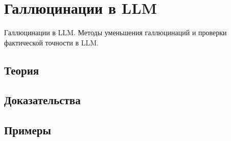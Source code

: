 
\section{Галлюцинации в LLM}
\label{sec:2.5.11-llm-hallucinations}

\begin{ticket}
Галлюцинации в LLM. Методы уменьшения галлюцинаций и проверки фактической точности в LLM.
\end{ticket}

\subsection*{Теория}

\subsection*{Доказательства}

\subsection*{Примеры}
